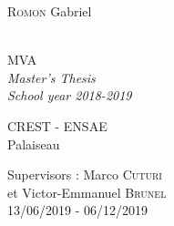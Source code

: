 \documentclass[12pt]{report}
\theoremstyle{definition}
\theoremstyle{remark}
\begin{document}
\thispagestyle{empty}
\noindent
\begin{minipage}{0.5\textwidth}
  \begin{flushleft} \Large
    \textsc{Romon} Gabriel\\
    \hfill\\
    \hfill
  \end{flushleft}
\end{minipage}
\noindent
\begin{minipage}{0.5\textwidth}
  \begin{flushright} 
  \Large
    MVA\\
    \textit{Master's Thesis}\\
    \textit{School year 2018-2019}
  \end{flushright}
\end{minipage}

 \vspace*{5cm}

\begin{center}
\end{center}

\vfill
\noindent
\begin{minipage}{0.5\textwidth}
  \begin{flushleft} \Large
    CREST - ENSAE\\
    Palaiseau\\
    \hfill
  \end{flushleft}
\end{minipage}
\noindent
\begin{minipage}{0.5\textwidth}
  \begin{flushright} \Large
    Supervisors : Marco \textsc{Cuturi}\\
    et Victor-Emmanuel \textsc{Brunel}\\
    13/06/2019 - 06/12/2019
  \end{flushright}
\end{minipage} 

\restoregeometry
\newpage\phantom{blabla}
\end{document}
